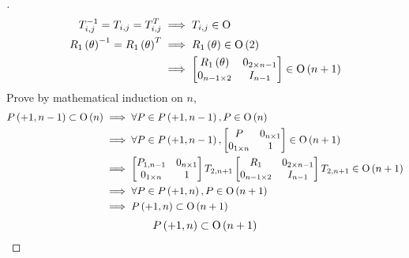 \documentclass[stu, babel, american, biblatex, a4paper, leqno, draftall]{apa7}
\begin{document}
\begin{proof}[]
    \begin{align*}
        T_{i,j}^{-1}=T_{i,j}=T_{i,j}^{T}
        & \implies T_{i,j}\in\operatorname{O} \\
        R_1\left(\theta\right)^{-1} = R_1\left(\theta\right)^{T}
        & \implies R_1\left(\theta\right)\in\operatorname{O}\left(2\right) \\
        & \implies 
        \begin{bmatrix}
            R_1\left(\theta\right) & 0_{2\times n-1} \\
            0_{n-1\times2} & I_{n-1} \\
        \end{bmatrix}\in\operatorname{O}\left(n+1\right)
    \end{align*}
    Prove by mathematical induction on $n$,
    \begin{align*}
        P\left(+1,n-1\right)\subset\operatorname{O}\left(n\right)
        & \implies
        \forall P\in P\left(+1,n-1\right),
        P\in\operatorname{O}\left(n\right) \\
        & \implies
        \forall P\in P\left(+1,n-1\right),
        \begin{bmatrix}
            P & 0_{n\times1} \\
            0_{1\times n} & 1 \\
        \end{bmatrix}\in\operatorname{O}\left(n+1\right) \\
        & \implies
        \begin{bmatrix}
            P_{1,n-1} & 0_{n\times1} \\
            0_{1\times n} & 1 \\
        \end{bmatrix}
        T_{2,n+1}
        \begin{bmatrix}
            R_{1} & 0_{2\times n-1} \\
            0_{n-1\times2} & I_{n-1} \\
        \end{bmatrix}
        T_{2,n+1}
        \in\operatorname{O}\left(n+1\right) \\
        & \implies
        \forall P\in P\left(+1,n\right),
        P \in\operatorname{O}\left(n+1\right) \\
        & \implies
        P\left(+1,n\right)\subset\operatorname{O}\left(n+1\right)
    \end{align*}
    \begin{equation}
        P\left(+1,n\right)\subset\operatorname{O}\left(n+1\right)
    \end{equation}
    

\end{proof}
\end{document}
